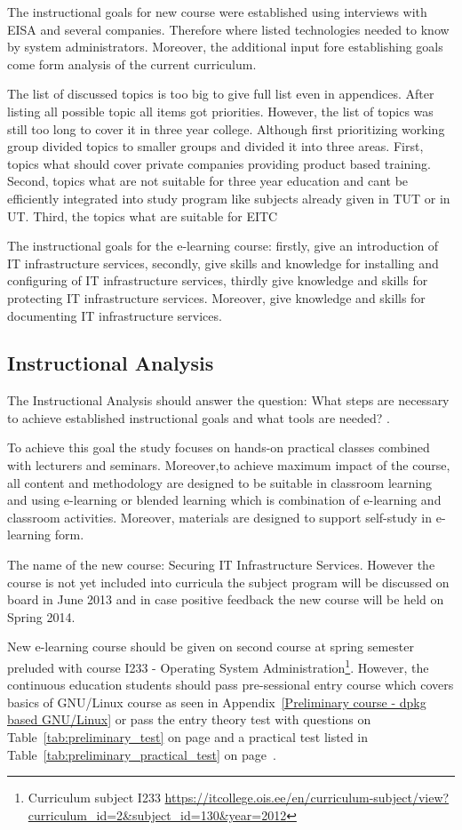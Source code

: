 The instructional goals for new course were established using interviews with \gls{EISA} and several companies. Therefore where listed technologies needed to know by system administrators. Moreover, the additional input fore establishing goals come form analysis of the current curriculum.

The list of discussed topics is too big to give full list even in appendices. After listing all possible topic all items got priorities. However, the list of topics was still too long to cover it in three year college. Although first prioritizing working group divided topics to smaller groups and divided it into three areas. First, topics what should cover private companies providing product based training. Second, topics what are not suitable for three year education and cant be efficiently integrated into study program like subjects already given in \gls{TUT} or in \gls{UT}. Third, the topics what are suitable for \gls{EITC}

The instructional goals for the e-learning course: firstly, give an introduction of IT infrastructure services, secondly, give skills and knowledge for installing and configuring of IT infrastructure services, thirdly give knowledge and skills for protecting IT infrastructure services. Moreover, give knowledge and skills for documenting IT infrastructure services.

\subsection{Instructional Analysis}
The Instructional Analysis should answer the question: What steps are necessary to achieve  established instructional goals and what tools are needed? \citep{website:addie}.

To achieve this goal the study focuses on hands-on practical classes combined with lecturers and seminars. Moreover,to achieve maximum impact of the course, all content and methodology are designed to be suitable in classroom learning and using e-learning or blended learning which is combination of e-learning and classroom activities. Moreover, materials are designed to support self-study in e-learning form.

The name of the new course: Securing IT Infrastructure Services. However the course is not yet included into curricula the subject program will be discussed on board in June 2013 and in case positive feedback the new course will be held on Spring 2014.

New e-learning course should be given on second course at spring semester preluded with course I233 - Operating System Administration\footnote{Curriculum subject I233 \url{https://itcollege.ois.ee/en/curriculum-subject/view?curriculum_id=2&subject_id=130&year=2012}}. However, the continuous education students should pass pre-sessional entry course which covers basics of GNU/Linux course as seen in Appendix~\ref{Preliminary course - dpkg based GNU/Linux} or pass the entry theory test with questions on Table~\ref{tab:preliminary_test} on page \pageref{tab:preliminary_test} and a practical test listed in Table~\ref{tab:preliminary_practical_test} on page~\pageref{tab:preliminary_practical_test}.

